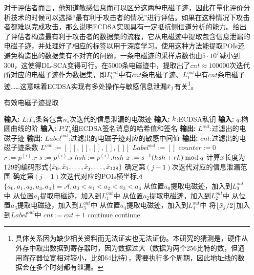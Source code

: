 {{	对于评估者而言，他知道敏感信息而可以区分这两种电磁子迹，因此在量化评价分析技术的时候可以选择“最有利于攻击者的情况”进行评估。如果在这种情况下攻击者都难以完成攻击，那么说明ECDSA实现具有一定抵抗侧信道分析的能力。给出了评估者构造最有利于攻击者的数据集的流程，它从电磁迹中提取包含信息泄漏的电磁子迹，并处理好了相应的标签以用于深度学习。使用这种方法能提取POIs还避免构造出的数据集有不对齐的问题，一条电磁迹的采样点数也由$5\cdot10^7$减小到300，这使得DL-SCA变得可行。在5000条电磁迹中，提取出了$cnt\approx100000$次迭代所对应的电磁子迹作为数据集，即$L_0^{out}$中有$cnt$条电磁子迹、$L_1^{out}$中有$cnt$条电磁子迹……这意味着ECDSA实现有多处操作与敏感信息泄漏$\tilde {x}_j$有关\footnote{具体关系因为缺少相关资料而无法证实也无法证伪。本研究的猜测是，硬件从外存中取出数据到寄存器时，因为数据过大（数据为两个256比特的数，但通用寄存器位宽相对较小，比如64比特），需要执行多个周期，因此地址线的数据会在多个时刻都有泄漏。}。
	
	\begin{breakablealgorithm}
		\caption{有效电磁子迹提取}\label{alg:filter}
		\begin{algorithmic}[1]
			\Statex \textbf{输入:} $L$:$T_a$条各包含$n_s$次迭代的信息泄漏的电磁迹
			\Statex \textbf{输入:} $k$:ECDSA私钥
			\Statex \textbf{输入:} $q$:椭圆曲线的阶
			\Statex \textbf{输入:} $P$:$T_a$组ECDSA签名消息的哈希值和签名
			\Statex \textbf{输出:} $L^{out}$:过滤出的电磁子迹
			\Statex \textbf{输出:} $Label^{out}$:过滤出的电磁子迹对应的敏感中间值
			\Statex \textbf{输出:} $cnt$:过滤出的电磁子迹条数
			\State $L^{out}:=\left[ [],[],[],[],[]\right] $
			\State $Label^{out}:=[]$
			\State $counter:=0$
				\State $r:=p^{(i)}.r$
				\State $s:=p^{(i)}.s$
				\State $hsh:=p^{(i)}.hsh$
				\State $x:=s^{-1}(hsh+rk)\bmod q$
				\State 计算$x$长度为129的编码形式$\left\{\tilde{x}_0,\tilde{x}_1,\dots,\tilde{x}_j,\dots, \tilde{x}_{128}\right\}$
						\State 确定第$(j-1)$次迭代对应的信息泄漏范围
						\State 确定第$(j-1)$次迭代对应的POIs横坐标$\mathcal A$
							\State $\{a_0,a_1,a_2,a_3,a_4\}=\mathcal A,a_0<a_1<a_2<a_3<a_4$
							\State 从位置$a_0$提取电磁迹，加入到$L_0^{out}$中
							\State 从位置$a_1$提取电磁迹，加入到$L_1^{out}$中
							\State 从位置$a_2$提取电磁迹，加入到$L_2^{out}$中
							\State 从位置$a_3$提取电磁迹，加入到$L_3^{out}$中
							\State 从位置$a_4$提取电磁迹，加入到$L_4^{out}$中
							\State 将$\left\lfloor\tilde{x}_j/2\right\rfloor$加入到$Label^{out}$中
							\State $cnt:=cnt+1$
						\Else
							\State continue
						\EndIf
					\Else
						\State continue
					\EndIf
				\EndFor
			\EndFor
		\end{algorithmic}
	\end{breakablealgorithm}
	
}}
